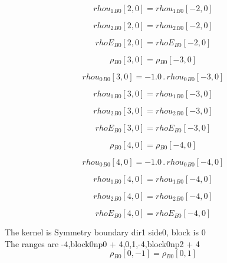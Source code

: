 \documentclass{article}
\begin{document}
\begin{dmath}{rhou_{1}{_{B0}}}[{2,0}] = {rhou_{1}{_{B0}}}[{-2,0}]\end{dmath}

\begin{dmath}{rhou_{2}{_{B0}}}[{2,0}] = {rhou_{2}{_{B0}}}[{-2,0}]\end{dmath}

\begin{dmath}{rhoE{_{B0}}}[{2,0}] = {rhoE{_{B0}}}[{-2,0}]\end{dmath}

\begin{dmath}{\rho{_{B0}}}[{3,0}] = {\rho{_{B0}}}[{-3,0}]\end{dmath}

\begin{dmath}{rhou_{0}{_{B0}}}[{3,0}] = - 1.0 \,.\, {rhou_{0}{_{B0}}}[{-3,0}]\end{dmath}

\begin{dmath}{rhou_{1}{_{B0}}}[{3,0}] = {rhou_{1}{_{B0}}}[{-3,0}]\end{dmath}

\begin{dmath}{rhou_{2}{_{B0}}}[{3,0}] = {rhou_{2}{_{B0}}}[{-3,0}]\end{dmath}

\begin{dmath}{rhoE{_{B0}}}[{3,0}] = {rhoE{_{B0}}}[{-3,0}]\end{dmath}

\begin{dmath}{\rho{_{B0}}}[{4,0}] = {\rho{_{B0}}}[{-4,0}]\end{dmath}

\begin{dmath}{rhou_{0}{_{B0}}}[{4,0}] = - 1.0 \,.\, {rhou_{0}{_{B0}}}[{-4,0}]\end{dmath}

\begin{dmath}{rhou_{1}{_{B0}}}[{4,0}] = {rhou_{1}{_{B0}}}[{-4,0}]\end{dmath}

\begin{dmath}{rhou_{2}{_{B0}}}[{4,0}] = {rhou_{2}{_{B0}}}[{-4,0}]\end{dmath}

\begin{dmath}{rhoE{_{B0}}}[{4,0}] = {rhoE{_{B0}}}[{-4,0}]\end{dmath}

\noindent The kernel is Symmetry boundary dir1 side0, block is 0\\\noindent The ranges are -4,block0np0 + 4,0,1,-4,block0np2 + 4\\\begin{dmath}{\rho{_{B0}}}[{0,-1}] = {\rho{_{B0}}}[{0,1}]\end{dmath}
\end{document}
